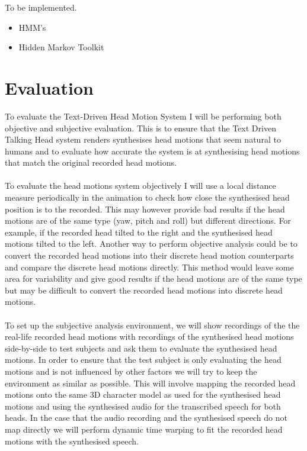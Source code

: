 \documentclass[bsc,frontabs,twoside,singlespacing,parskip]{infthesis}
\begin{document}
To be implemented.
\begin{itemize}
	\item{ HMM's}
	\item{Hidden Markov Toolkit}
\end{itemize}

\section{Evaluation}
To evaluate the Text-Driven Head Motion System I will be performing both objective  and subjective evaluation. This is to ensure that the Text Driven Talking Head system renders synthesises head motions that seem natural to humans and to evaluate how accurate the system is at synthesising head motions that match the original recorded head motions.
\\
\\
To evaluate the head motions system objectively I will use a local distance measure periodically in the animation to check how close the synthesised head position is to the recorded. This may however provide bad results if the head motions are of the same type (yaw, pitch and roll) but different directions. For example, if the recorded head tilted to the right and the synthesised head motions tilted to the left. Another way to perform objective analysis could be to convert the recorded head motions into their discrete head motion counterparts and compare the discrete head motions directly. This method would leave some area for variability and give good results if the head motions are of the same type but may be difficult to convert the recorded head motions into discrete head motions.
\\
\\
To set up the subjective analysis environment, we will show recordings of  the the real-life recorded head motions with recordings of the synthesised head motions side-by-side to test subjects and ask them to evaluate the synthesised head motions. In order to ensure that the test subject is only evaluating the head motions and is not influenced by other factors we will try to keep the environment as similar as possible. This will involve mapping the recorded head motions onto the same 3D character model as used for the synthesised head motions and using the synthesised audio for the transcribed speech for both heads. In the case that the audio recording and the synthesised speech do not map directly we will perform dynamic time warping to fit the recorded head motions with the synthesised speech.
\\
\\
\end{document}
